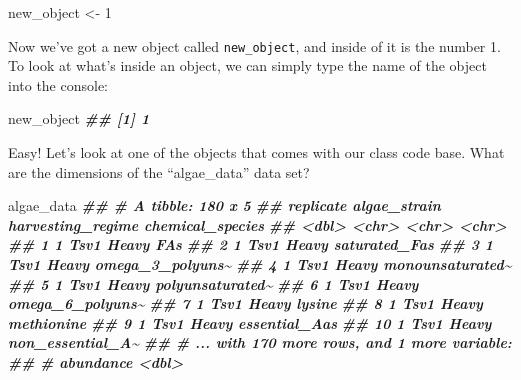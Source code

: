 \documentclass[
]{krantz}
\newenvironment{Shaded}{\begin{snugshade}}{\end{snugshade}}
\newcommand{\DecValTok}[1]{\textcolor[rgb]{0.00,0.00,0.81}{#1}}
\newcommand{\DocumentationTok}[1]{\textcolor[rgb]{0.56,0.35,0.01}{\textbf{\textit{#1}}}}
\newcommand{\NormalTok}[1]{#1}
\newcommand{\OtherTok}[1]{\textcolor[rgb]{0.56,0.35,0.01}{#1}}
\begin{document}
\begin{Shaded}
\begin{Highlighting}[]
\NormalTok{new\_object }\OtherTok{\textless{}{-}} \DecValTok{1}
\end{Highlighting}
\end{Shaded}

Now we've got a new object called \texttt{new\_object}, and inside of it is the number 1. To look at what's inside an object, we can simply type the name of the object into the console:

\begin{Shaded}
\begin{Highlighting}[]
\NormalTok{new\_object}
\DocumentationTok{\#\# [1] 1}
\end{Highlighting}
\end{Shaded}

Easy! Let's look at one of the objects that comes with our class code base. What are the dimensions of the ``algae\_data'' data set?

\begin{Shaded}
\begin{Highlighting}[]
\NormalTok{algae\_data}
\DocumentationTok{\#\# \# A tibble: 180 x 5}
\DocumentationTok{\#\#    replicate algae\_strain harvesting\_regime chemical\_species}
\DocumentationTok{\#\#        \textless{}dbl\textgreater{} \textless{}chr\textgreater{}        \textless{}chr\textgreater{}             \textless{}chr\textgreater{}           }
\DocumentationTok{\#\#  1         1 Tsv1         Heavy             FAs             }
\DocumentationTok{\#\#  2         1 Tsv1         Heavy             saturated\_Fas   }
\DocumentationTok{\#\#  3         1 Tsv1         Heavy             omega\_3\_polyuns\textasciitilde{}}
\DocumentationTok{\#\#  4         1 Tsv1         Heavy             monounsaturated\textasciitilde{}}
\DocumentationTok{\#\#  5         1 Tsv1         Heavy             polyunsaturated\textasciitilde{}}
\DocumentationTok{\#\#  6         1 Tsv1         Heavy             omega\_6\_polyuns\textasciitilde{}}
\DocumentationTok{\#\#  7         1 Tsv1         Heavy             lysine          }
\DocumentationTok{\#\#  8         1 Tsv1         Heavy             methionine      }
\DocumentationTok{\#\#  9         1 Tsv1         Heavy             essential\_Aas   }
\DocumentationTok{\#\# 10         1 Tsv1         Heavy             non\_essential\_A\textasciitilde{}}
\DocumentationTok{\#\# \# ... with 170 more rows, and 1 more variable:}
\DocumentationTok{\#\# \#   abundance \textless{}dbl\textgreater{}}
\end{Highlighting}
\end{Shaded}
\end{document}

